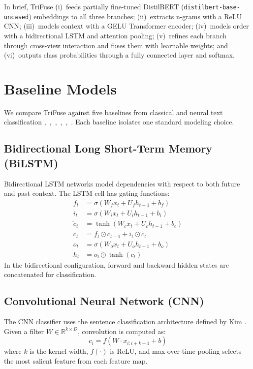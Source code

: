 In brief, TriFuse (i)~feeds partially fine-tuned DistilBERT (\texttt{distilbert-base-uncased}) embeddings to all three branches; (ii)~extracts n-grams with a ReLU CNN; (iii)~models context with a GELU Transformer encoder; (iv)~models order with a bidirectional LSTM and attention pooling; (v)~refines each branch through cross-view interaction and fuses them with learnable weights; and (vi)~outputs class probabilities through a fully connected layer and softmax.

\section{Baseline Models}

We compare TriFuse against five baselines from classical and neural text classification \cite{ref3},~\cite{ref5},~\cite{ref6},~\cite{ref7},~\cite{ref8},~\cite{ref31}. Each baseline isolates one standard modeling choice.

\subsection{Bidirectional Long Short-Term Memory (BiLSTM)}

Bidirectional LSTM networks model dependencies with respect to both future and past context. The LSTM cell has gating functions:
\begin{equation}
\begin{aligned}
f_t &= \sigma(W_f x_t + U_f h_{t-1} + b_f) \\
i_t &= \sigma(W_i x_t + U_i h_{t-1} + b_i) \\
\tilde{c}_t &= \tanh(W_c x_t + U_c h_{t-1} + b_c) \\
c_t &= f_t \odot c_{t-1} + i_t \odot \tilde{c}_t \\
o_t &= \sigma(W_o x_t + U_o h_{t-1} + b_o) \\
h_t &= o_t \odot \tanh(c_t)
\end{aligned}
\end{equation}
In the bidirectional configuration, forward and backward hidden states are concatenated for classification.

\subsection{Convolutional Neural Network (CNN)}

The CNN classifier uses the sentence classification architecture defined by Kim \cite{ref7}. Given a filter $W \in \mathbb{R}^{k \times D}$, convolution is computed as:
\begin{equation}
c_i = f(W \cdot x_{i:i+k-1} + b)
\end{equation}
where $k$ is the kernel width, $f(\cdot)$ is ReLU, and max-over-time pooling selects the most salient feature from each feature map.

